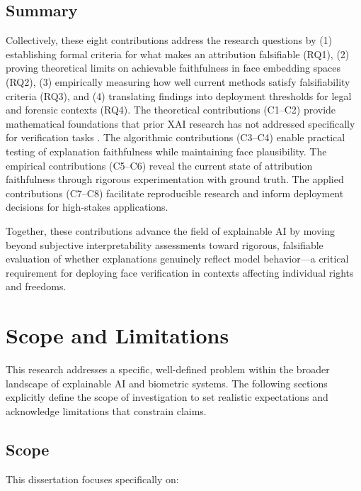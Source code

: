 \subsection{Summary}

Collectively, these eight contributions address the research questions by (1) establishing formal criteria for what makes an attribution falsifiable (RQ1), (2) proving theoretical limits on achievable faithfulness in face embedding spaces (RQ2), (3) empirically measuring how well current methods satisfy falsifiability criteria (RQ3), and (4) translating findings into deployment thresholds for legal and forensic contexts (RQ4). The theoretical contributions (C1--C2) provide mathematical foundations that prior XAI research has not addressed specifically for verification tasks \cite{Samek2021_XAI_Review}. The algorithmic contributions (C3--C4) enable practical testing of explanation faithfulness while maintaining face plausibility. The empirical contributions (C5--C6) reveal the current state of attribution faithfulness through rigorous experimentation with ground truth. The applied contributions (C7--C8) facilitate reproducible research and inform deployment decisions for high-stakes applications.

Together, these contributions advance the field of explainable AI by moving beyond subjective interpretability assessments toward rigorous, falsifiable evaluation of whether explanations genuinely reflect model behavior---a critical requirement for deploying face verification in contexts affecting individual rights and freedoms.

\section{Scope and Limitations}
\label{sec:scope_limitations}

This research addresses a specific, well-defined problem within the broader landscape of explainable AI and biometric systems. The following sections explicitly define the scope of investigation to set realistic expectations and acknowledge limitations that constrain claims.

\subsection{Scope}

This dissertation focuses specifically on:

